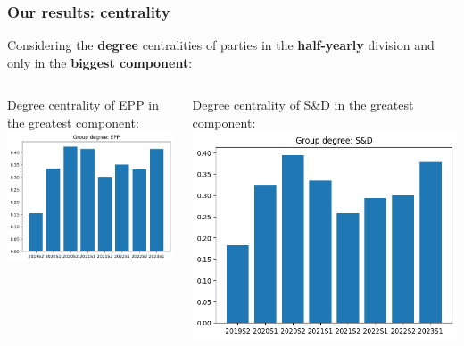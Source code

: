 \documentclass{beamer}
\begin{document}
\begin{frame}
\frametitle{Our results: centrality}
	
	Considering the \textbf{degree} centralities of parties in the \textbf{half-yearly} division and only in the \textbf{biggest component}:
	\vspace{4mm}
	\pause
	
\begin{columns}
	\begin{column}{0.5\textwidth}
	Degree centrality of EPP in the greatest component:
	\\
	\includegraphics[width=\textwidth]{img/EPP_HY_deg.png}
	\end{column}
	
	\pause 
	\begin{column}{0.5\textwidth}
	Degree centrality of S\&D in the greatest component:
	\includegraphics[width=\textwidth]{img/S&D_HY_deg.png}
	\end{column}
\end{columns}

\end{frame}
\end{document}

